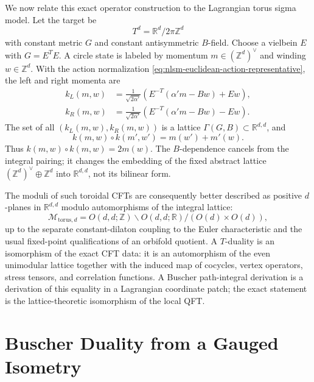 We now relate this exact operator construction to the Lagrangian torus
sigma model.  Let the target be
\[
  T^d=\mathbb R^d/2\pi\mathbb Z^d
\]
with constant metric \(G\) and constant antisymmetric \(B\)-field.  Choose a
vielbein \(E\) with \(G=E^T E\).  A circle state is labeled by momentum
\(m\in(\mathbb Z^d)^\vee\) and winding \(w\in\mathbb Z^d\).  With the action
normalization \eqref{eq:nlsm-euclidean-action-representative}, the left and
right momenta are
\begin{align}
  k_L(m,w)
  &=
  \frac1{\sqrt{2\alpha'}}
  \left(E^{-T}(\alpha' m-Bw)+Ew\right),
  \label{eq:toroidal-left-momentum}
  \\
  k_R(m,w)
  &=
  \frac1{\sqrt{2\alpha'}}
  \left(E^{-T}(\alpha' m-Bw)-Ew\right).
  \label{eq:toroidal-right-momentum}
\end{align}
The set of all \((k_L(m,w),k_R(m,w))\) is a lattice
\(\Gamma(G,B)\subset\mathbb R^{d,d}\), and
\begin{equation}
  k(m,w)\circ k(m',w')
  =
  m(w')+m'(w).
  \label{eq:toroidal-narain-pairing}
\end{equation}
Thus \(k(m,w)\circ k(m,w)=2m(w)\).  The \(B\)-dependence cancels from the
integral pairing; it changes the embedding of the fixed abstract lattice
\((\mathbb Z^d)^\vee\oplus\mathbb Z^d\) into
\(\mathbb R^{d,d}\), not its bilinear form.

The moduli of such toroidal CFTs are consequently better described as
positive \(d\)-planes in \(\mathbb R^{d,d}\) modulo automorphisms of the
integral lattice:
\begin{equation}
  \mathcal M_{\mathrm{torus},d}
  =
  O(d,d;\mathbb Z)\backslash
  O(d,d;\mathbb R)/(O(d)\times O(d)),
  \label{eq:toroidal-narain-moduli-space}
\end{equation}
up to the separate constant-dilaton coupling to the Euler characteristic and
the usual fixed-point qualifications of an orbifold quotient.  A
\(T\)-duality is an isomorphism of the exact CFT data: it is an automorphism
of the even unimodular lattice together with the induced map of cocycles,
vertex operators, stress tensors, and correlation functions.  A Buscher
path-integral derivation is a derivation of this equality in a Lagrangian
coordinate patch; the exact statement is the lattice-theoretic isomorphism
of the local QFT.

\section{Buscher Duality from a Gauged Isometry}
\label{sec:buscher-duality-gauged-isometry}

